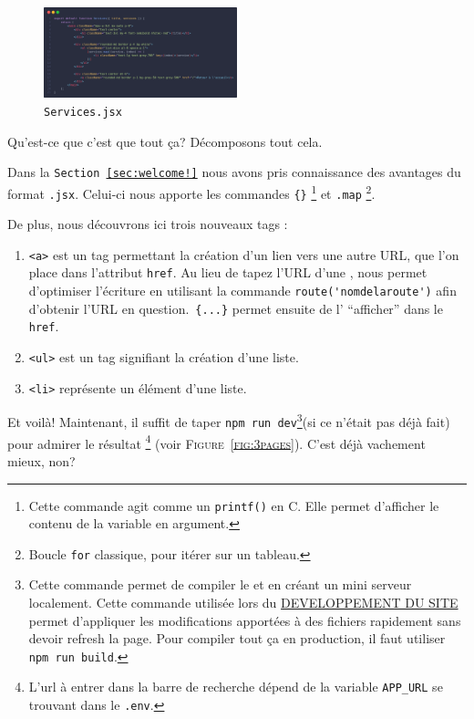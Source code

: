 \newpage

\begin{figure}
    \centering
    \includegraphics[width=0.5\textwidth]{figures-C1/services.jsx.png}
    \caption{\texttt{Services.jsx}}
\end{figure}

Qu'est-ce que c'est que tout ça? Décomposons tout cela.

 Dans la \texttt{Section~\ref{sec:welcome!}} nous avons pris connaissance des avantages du format \verb|.jsx|. Celui-ci nous apporte les commandes \verb|{}| \footnote{Cette commande agit comme un \verb|printf()| en C. Elle permet d'afficher le contenu de la variable en argument.} et \verb|.map| \footnote{Boucle \verb|for| classique, pour itérer sur un tableau.}.

\begin{minipage}{\textwidth}
De plus, nous découvrons ici trois nouveaux tags \html{}:

\begin{enumerate}
    \item \verb|<a>| est un tag permettant la création d'un lien vers une autre URL, que l'on place dans l'attribut \verb|href|. Au lieu de tapez l'URL d'une \route{}, \inertia{} nous permet d'optimiser l'écriture en utilisant la commande \verb|route('nomdelaroute')| afin d'obtenir l'URL en question.~\verb|{...}| permet ensuite de l' ``afficher'' dans le \verb|href|.
    \item \verb|<ul>| est un tag signifiant la création d'une liste.
    \item \verb|<li>| représente un élément d'une liste.
\end{enumerate}
\end{minipage}


Et voilà! Maintenant, il suffit de taper \verb|npm run dev|\footnote{Cette commande permet de compiler le \css{} et \js{} en créant un mini serveur localement. Cette commande utilisée lors du \underline{DEVELOPPEMENT DU SITE} permet d'appliquer les modifications apportées à des fichiers rapidement sans devoir refresh la page. Pour compiler tout ça en production, il faut utiliser \verb|npm run build|.}(si ce n'était pas déjà fait) pour admirer le résultat \footnote{L'url à entrer dans la barre de recherche dépend de la variable \texttt{APP\_URL} se trouvant dans le \texttt{.env}.} (voir \textsc{Figure~\ref{fig:3pages}}). C'est déjà vachement mieux, non?

